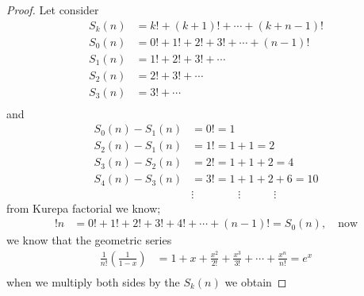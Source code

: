\documentclass[pdflatex,sn-mathphys-num]{sn-jnl}%
\theoremstyle{thmstyleone}%
\theoremstyle{thmstyletwo}%
\theoremstyle{thmstylethree}%
\begin{document}
\begin{proof}
Let consider 
\begin{align*}
S_k(n) &= k! + (k+1)! + \cdots + (k+n-1)!\\\nonumber
S_0(n) &= 0!+1!+2!+3! + \cdots + (n-1)!\\ \nonumber
S_1(n) &= 1!+2!+3! + \cdots \\ \nonumber
S_2(n) &= 2!+3! + \cdots  \\ \nonumber
S_3(n) &= 3! + \cdots \\\nonumber
\end{align*}
and 
\begin{align*}
S_0(n) - S_1(n) &= 0!=1\\
S_2(n) - S_1(n) &= 1!=1+1 = 2\\
S_3(n) - S_2(n) &= 2!=1+1+2 = 4\\
S_4(n) - S_3(n) &= 3!=1+ 1+ 2 +6 = 10\\
&\vdots \quad \quad \quad \quad \vdots \quad \quad \quad\vdots \quad \quad \quad
\end{align*}
from Kurepa factorial we know;
\begin{align*}
!n &= 0! +1! + 2! +3! +4! +\cdots+(n-1)!= S_0(n), \quad \mbox{now}
\end{align*}
we know that the geometric series \cite{euler1862opera}
\begin{align*}
\frac{1}{n!}\left(\frac{1}{1-x}\right) &= 1 +x +\frac{x^2}{2!}+ \frac{x^3}{3!} + \cdots +\frac{x^n}{n!} = e^x\\
\end{align*}
when we multiply both sides by the $S_k(n)$ we obtain

\end{proof}
\end{document}
